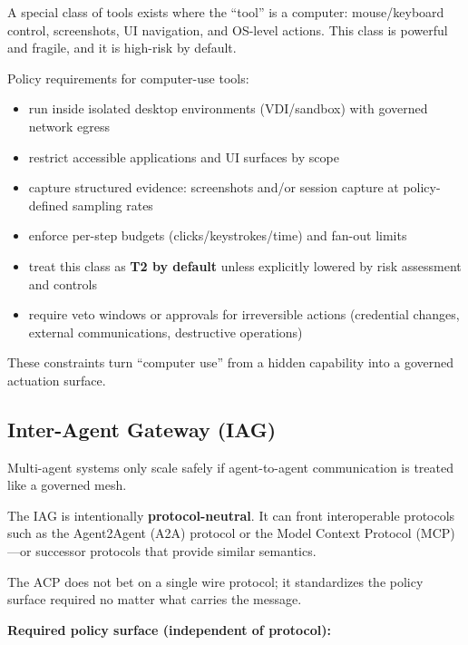 \documentclass[11pt]{article}
\begin{document}
A special class of tools exists where the ``tool'' is a computer:
mouse/keyboard control, screenshots, UI navigation, and OS-level
actions. This class is powerful and fragile, and it is high-risk by
default.

Policy requirements for computer-use tools:

\begin{itemize}
\tightlist
\item
  run inside isolated desktop environments (VDI/sandbox) with governed
  network egress
\item
  restrict accessible applications and UI surfaces by scope
\item
  capture structured evidence: screenshots and/or session capture at
  policy-defined sampling rates
\item
  enforce per-step budgets (clicks/keystrokes/time) and fan-out limits
\item
  treat this class as \textbf{T2 by default} unless explicitly lowered
  by risk assessment and controls
\item
  require veto windows or approvals for irreversible actions (credential
  changes, external communications, destructive operations)
\end{itemize}

These constraints turn ``computer use'' from a hidden capability into a
governed actuation surface.

\hypertarget{inter-agent-gateway-iag}{%
\subsection{Inter-Agent Gateway (IAG)}\label{inter-agent-gateway-iag}}

Multi-agent systems only scale safely if agent-to-agent communication is
treated like a governed mesh.

The IAG is intentionally \textbf{protocol-neutral}. It can front
interoperable protocols such as the Agent2Agent (A2A) protocol or the
Model Context Protocol (MCP)---or successor protocols that provide
similar semantics.

The ACP does not bet on a single wire protocol; it standardizes the
policy surface required no matter what carries the message.

\textbf{Required policy surface (independent of protocol):}
\end{document}
